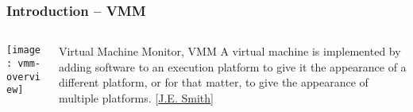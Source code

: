 \begin{frame}%
	\frametitle{Introduction -- VMM}
	
	
	
	\begin{columns}
		
		\begin{column}{.5\textwidth}
			
			\texttt{[image: vmm-overview]}
			
		\end{column}
		
		\begin{column}{.5\textwidth}
			
			
			\begin{block}{Virtual Machine Monitor, VMM}
				A virtual machine is implemented by adding software to an execution platform to give it the appearance of a {\color{blue}different platform}, or for that matter, to give the appearance of {\color{blue}multiple platforms}. [\href{https://personal.utdallas.edu/~muratk/courses/cloud11f_files/smith-vm-overview.pdf}{J.E. Smith}]
			\end{block}
		\end{column}
		
		
	\end{columns}
	
	
\end{frame}


